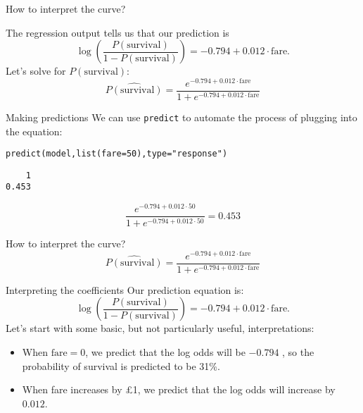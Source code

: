 \documentclass{beamer}\usepackage[]{graphicx}\usepackage[]{color}
\makeatletter
\newcommand{\hlnum}[1]{\textcolor[rgb]{0.824,0.412,0.118}{#1}}%
\newcommand{\hlstr}[1]{\textcolor[rgb]{1,0.894,0.71}{#1}}%
\newcommand{\hlstd}[1]{\textcolor[rgb]{1,0.894,0.769}{#1}}%
\newcommand{\hlkwc}[1]{\textcolor[rgb]{0.78,0.941,0.545}{#1}}%
\newcommand{\hlkwd}[1]{\textcolor[rgb]{1,0.78,0.769}{#1}}%
\newenvironment{kframe}{%
 \def\at@end@of@kframe{}%
 \ifinner\ifhmode%
  \def\at@end@of@kframe{\end{minipage}}%
  \begin{minipage}{\columnwidth}%
 \fi\fi%
 \def\FrameCommand##1{\hskip\@totalleftmargin \hskip-\fboxsep
 \colorbox{shadecolor}{##1}\hskip-\fboxsep
     \hskip-\linewidth \hskip-\@totalleftmargin \hskip\columnwidth}%
 \MakeFramed {\advance\hsize-\width
   \@totalleftmargin\z@ \linewidth\hsize
   \@setminipage}}%
 {\par\unskip\endMakeFramed%
 \at@end@of@kframe}
\newenvironment{knitrout}{}{} %
\makeatother
\begin{document}
\begin{darkframes}
    \begin{frame}{How to interpret the curve?}
      
      The regression output tells us that our prediction is
      \[
        \log\left(\frac{P(\text{survival})}{1-P(\text{survival})}\right) = -0.794 + 0.012\cdot\text{fare}.
      \]
      \pause
      Let's solve for $P(\text{survival})$:
      \[
        \widehat{P(\text{survival})} = \frac{e^{-0.794 + 0.012\cdot\text{fare}}}{1 + e^{-0.794 + 0.012\cdot\text{fare}}}
      \]
      \lc
    \end{frame}

\begin{frame}[fragile]{Making predictions}
      We can use \texttt{predict} to automate the process of plugging into the equation:
\begin{knitrout}
\begin{kframe}
\begin{alltt}
\hlkwd{predict}\hlstd{(model,} \hlkwd{list}\hlstd{(}\hlkwc{fare}\hlstd{=}\hlnum{50}\hlstd{),} \hlkwc{type}\hlstd{=}\hlstr{"response"}\hlstd{)}
\end{alltt}
\begin{verbatim}
    1 
0.453 
\end{verbatim}
\end{kframe}
\end{knitrout}
      
      \[
        \frac{e^{-0.794 + 0.012\cdot 50}}{1 + e^{-0.794 + 0.012\cdot 50}} = 0.453
      \]
\end{frame}

\begin{frame}[fragile]{How to interpret the curve?}
      \[
        \widehat{P(\text{survival})} = \frac{e^{-0.794 + 0.012\cdot\text{fare}}}{1 + e^{-0.794 + 0.012\cdot\text{fare}}}
      \]
\begin{knitrout}


\end{knitrout}
\end{frame}

    \begin{frame}{Interpreting the coefficients}
      Our prediction equation is:
      \[
        \log\left(\frac{P(\text{survival})}{1-P(\text{survival})}\right) = -0.794 + 0.012\cdot\text{fare}.
      \]
      Let's start with some basic, but not particularly useful, interpretations:
      \begin{itemize}[<+->]
        \item When $\text{fare}=0$, we predict that the log odds will be $-0.794$ \pause, so the probability of survival is predicted to be 31\%.
        \item When fare increases by \pounds 1, we predict that the log odds will increase by $0.012$.
      \end{itemize}
    \end{frame}


\end{darkframes}
\end{document}
